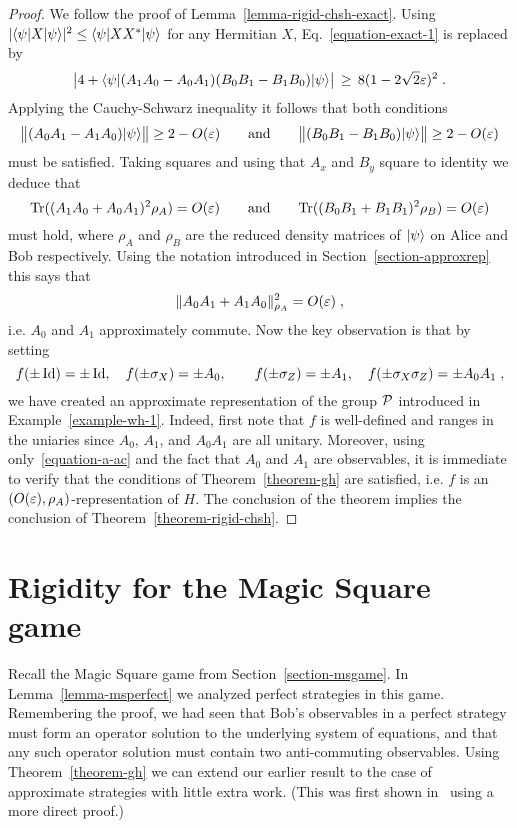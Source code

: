 \begin{proof}
We follow the proof of Lemma~\ref{lemma-rigid-chsh-exact}. Using $|\langle\psi|X|\psi\rangle|^2 \leq \langle\psi|XX^*|\psi\rangle$ for any Hermitian $X$,
Eq.~\eqref{equation-exact-1} is replaced by
\[ \big|4+\langle\psi|(A_1A_0-A_0A_1) (B_0B_1-B_1B_0)|\psi\rangle \big|\,\geq\, 8(1-2\sqrt{2}\varepsilon)^2\;.\]
Applying the Cauchy-Schwarz inequality it follows that both conditions
\[ \big\|(A_0A_1-A_1A_0)|\psi\rangle\big\| \geq 2-O(\varepsilon) \qquad \text{and}\qquad\big\|(B_0B_1-B_1B_0)|\psi\rangle\big\| \geq 2-O(\varepsilon)\]
must be satisfied. Taking squares and using that $A_x$ and $B_y$ square to identity we deduce that 
$$\mathrm{Tr}((A_1A_0 + A_0A_1)^2\rho_A) = O({\varepsilon})\qquad \text{and}\qquad \mathrm{Tr}((B_0B_1+B_1B_1)^2 \rho_B) = O({\varepsilon})$$
must hold, where $\rho_A$ and $\rho_B$ are the reduced density matrices of $|\psi\rangle$ on Alice and Bob respectively. 
Using the notation introduced in Section~\ref{section-approxrep} this says that 
\begin{equation}\label{equation-a-ac}
\|A_0A_1 + A_1A_0\|_{\rho_A}^2 = O({\varepsilon})\;,
\end{equation}
 i.e. $A_0$ and $A_1$ approximately commute. Now the key observation is that by setting 
$$ f(\pm \mathop{\rm Id}\nolimits)=\pm\mathop{\rm Id}\nolimits,\quad f(\pm\sigma_X)=\pm A_0,\quad\quad f(\pm\sigma_Z)=\pm A_1,\quad f(\pm\sigma_X\sigma_Z) = \pm A_0A_1\;,$$
we have created an approximate representation of the group $\mathcal{P}$ introduced in Example~\ref{example-wh-1}. Indeed, first note that $f$ is well-defined and ranges in the uniaries since $A_0$, $A_1$, and $A_0A_1$ are all unitary. Moreover, using only~\eqref{equation-a-ac} and the fact that $A_0$ and $A_1$ are observables, it is immediate to verify that the conditions of Theorem~\ref{theorem-gh} are satisfied, i.e. $f$ is an $(O({\varepsilon}),\rho_A)$-representation of $H$. The conclusion of the theorem implies the conclusion of Theorem~\ref{theorem-rigid-chsh}.
\end{proof}



\section{Rigidity for the Magic Square game}
\label{section-msrigid}


Recall the Magic Square game from Section~\ref{section-msgame}. In Lemma~\ref{lemma-msperfect} we analyzed perfect strategies in this game. Remembering the proof, we had seen that Bob's observables in a perfect strategy must form an operator solution to the underlying system of equations, and that any such operator solution must contain two anti-commuting observables. Using Theorem~\ref{theorem-gh} we can extend our earlier result to the case of approximate strategies with little extra work. (This was first shown in~\cite{wu2016device} using a more direct proof.)

